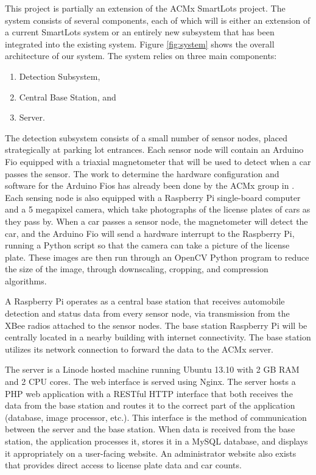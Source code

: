 \documentclass[11pt, oneside, fullpage, doublespace]{article}
\begin{document}
This project is partially an extension of the ACMx SmartLots project. The system consists of several components, each of which will is either an extension of a current SmartLots system or an entirely new subsystem that has been integrated into the existing system. Figure \ref{fig:system} shows the overall architecture of our system. The system relies on three main components:
\begin{enumerate}
\item Detection Subsystem,
\item Central Base Station, and
\item Server.
\end{enumerate}

The detection subsystem consists of a small number of sensor nodes, placed strategically at parking lot entrances. Each sensor node will contain an Arduino Fio equipped with a triaxial magnetometer that will be used to detect when a car passes the sensor. The work to determine the hardware configuration and software for the Arduino Fios has already been done by the ACMx group in \cite{stillwell2013}. Each sensing node is also equipped with a Raspberry Pi single-board computer and a 5 megapixel camera, which take photographs of the license plates of cars as they pass by. When a car passes a sensor node, the magnetometer will detect the car, and the Arduino Fio will send a hardware interrupt to the Raspberry Pi, running a Python script so that the camera can take a picture of the license plate. These images are then run through an OpenCV Python program to reduce the size of the image, through downscaling, cropping, and compression algorithms.

A Raspberry Pi operates as a central base station that receives automobile detection and status data from every sensor node, via transmission from the XBee radios attached to the sensor nodes. The base station Raspberry Pi will be centrally located in a nearby building with internet connectivity. The base station utilizes its network connection to forward the data to the ACMx server.

The server is a Linode hosted machine running Ubuntu 13.10 with 2 GB RAM and 2 CPU cores. The web interface is served using Nginx. The server hosts a PHP web application with a RESTful HTTP interface that both receives the data from the base station and routes it to the correct part of the application (database, image processor, etc.). This interface is the method of communication between the server and the base station. When data is received from the base station, the application processes it, stores it in a MySQL database, and displays it appropriately on a user-facing website. An administrator website also exists that provides direct access to license plate data and car counts.
\end{document}
